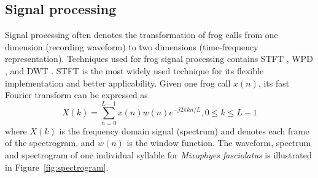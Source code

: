 \subsection{Signal processing}
Signal processing often denotes the transformation of frog calls from one dimension (recording waveform) to two dimensions (time-frequency representation). Techniques used for frog signal processing contains STFT \citep{huang2009frog, Huang20141, Colonna20157367}, WPD \citep{yen2002automatic}, and DWT \citep{colonna2012feature}. STFT is the most widely used technique for its flexible implementation and better applicability. Given one frog call $x(n)$, its fast Fourier transform can be expressed as
\begin{equation}
X(k) = \sum_{n=0}^{L-1}x(n)w(n)e^{-j2 \pi kn/L}, 0 \leq k \leq L-1
\end{equation}
where $X(k)$ is the frequency domain signal (spectrum) and denotes each frame of the spectrogram, and $w(n)$ is the window function. The waveform, spectrum and spectrogram of one individual syllable for \textit{Mixophyes fasciolatus} is illustrated in Figure~\ref{fig:spectrogram}. 

